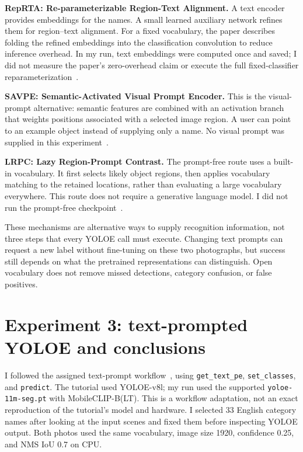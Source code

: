 \documentclass[10pt,letterpaper]{article}
\begin{document}
\textbf{RepRTA: Re-parameterizable Region-Text Alignment.} A text encoder provides embeddings for the names. A small learned auxiliary network refines them for region--text alignment. For a fixed vocabulary, the paper describes folding the refined embeddings into the classification convolution to reduce inference overhead. In my run, text embeddings were computed once and saved; I did not measure the paper's zero-overhead claim or execute the full fixed-classifier reparameterization~\cite{yoloepaper,yoloedocs}.

\textbf{SAVPE: Semantic-Activated Visual Prompt Encoder.} This is the visual-prompt alternative: semantic features are combined with an activation branch that weights positions associated with a selected image region. A user can point to an example object instead of supplying only a name. No visual prompt was supplied in this experiment~\cite{yoloepaper}.

\textbf{LRPC: Lazy Region-Prompt Contrast.} The prompt-free route uses a built-in vocabulary. It first selects likely object regions, then applies vocabulary matching to the retained locations, rather than evaluating a large vocabulary everywhere. This route does not require a generative language model. I did not run the prompt-free checkpoint~\cite{yoloepaper}.

These mechanisms are alternative ways to supply recognition information, not three steps that every YOLOE call must execute. Changing text prompts can request a new label without fine-tuning on these two photographs, but success still depends on what the pretrained representations can distinguish. Open vocabulary does not remove missed detections, category confusion, or false positives.

\newpage
\section{Experiment 3: text-prompted YOLOE and conclusions}
I followed the assigned text-prompt workflow~\cite{openTutorial}, using \texttt{get\_text\_pe}, \texttt{set\_classes}, and \texttt{predict}. The tutorial used YOLOE-v8l; my run used the supported \texttt{yoloe-11m-seg.pt} with MobileCLIP-B(LT). This is a workflow adaptation, not an exact reproduction of the tutorial's model and hardware. I selected 33 English category names after looking at the input scenes and fixed them before inspecting YOLOE output. Both photos used the same vocabulary, image size 1920, confidence 0.25, and NMS IoU 0.7 on CPU.
\end{document}

